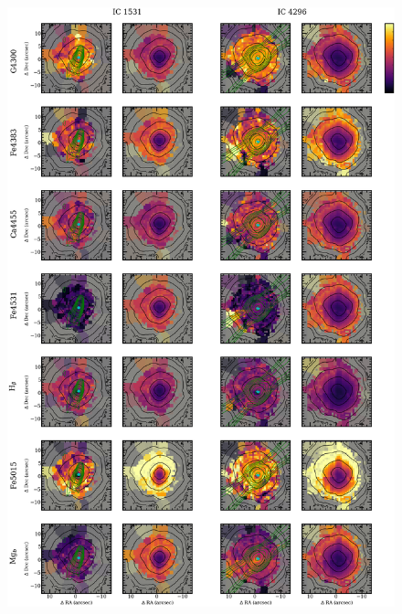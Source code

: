 {{\begin{figure}
			\includegraphics[height=0.94\textheight]{chapter4/vimos/abs2.png}
		\end{figure}
		\begin{figure}
			\centering

\end{figure}}}
